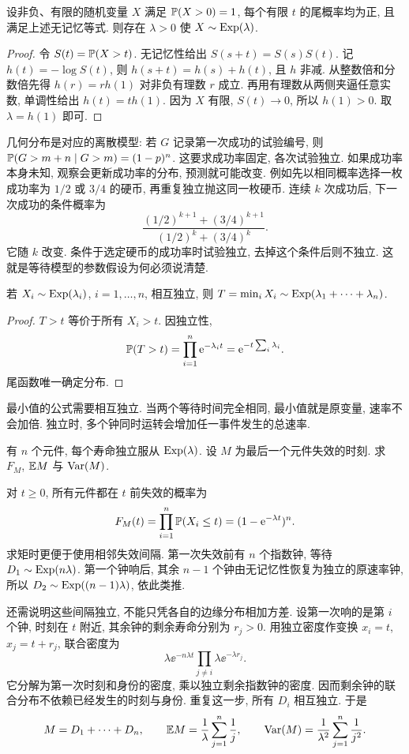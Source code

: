 \begin{proposition}[无记忆分布的刻画]
设非负、有限的随机变量 $X$ 满足 $\mathbb P(X>0)=1$, 每个有限 $t$ 的尾概率均为正, 且满足上述无记忆等式. 则存在 $\lambda>0$ 使 $X\sim\operatorname{Exp}(\lambda)$.
\end{proposition}
\begin{proof}
令 $S(t)=\mathbb P(X>t)$. 无记忆性给出 $S(s+t)=S(s)S(t)$. 记 $h(t)=-\log S(t)$, 则 $h(s+t)=h(s)+h(t)$, 且 $h$ 非减. 从整数倍和分数倍先得 $h(r)=rh(1)$ 对非负有理数 $r$ 成立. 再用有理数从两侧夹逼任意实数, 单调性给出 $h(t)=th(1)$. 因为 $X$ 有限, $S(t)\to0$, 所以 $h(1)>0$. 取 $\lambda=h(1)$ 即可.
\end{proof}

几何分布是对应的离散模型: 若 $G$ 记录第一次成功的试验编号, 则
$\mathbb P(G>m+n\mid G>m)=(1-p)^n$. 这要求成功率固定, 各次试验独立. 如果成功率本身未知, 观察会更新成功率的分布, 预测就可能改变. 例如先以相同概率选择一枚成功率为 $1/2$ 或 $3/4$ 的硬币, 再重复独立抛这同一枚硬币. 连续 $k$ 次成功后, 下一次成功的条件概率为
\[
 \frac{(1/2)^{k+1}+(3/4)^{k+1}}{(1/2)^k+(3/4)^k}.
\]
它随 $k$ 改变. 条件于选定硬币的成功率时试验独立, 去掉这个条件后则不独立. 这就是等待模型的参数假设为何必须说清楚.

\begin{proposition}[独立指数变量的最小值]
若 $X_i\sim\operatorname{Exp}(\lambda_i)$, $i=1,\ldots,n$, 相互独立, 则
$T=\min_i X_i\sim\operatorname{Exp}(\lambda_1+\cdots+\lambda_n)$.
\end{proposition}
\begin{proof}
$T>t$ 等价于所有 $X_i>t$. 因独立性,
\[
 \mathbb P(T>t)=\prod_{i=1}^n\mathrm e^{-\lambda_i t}
 =\mathrm e^{-t\sum_i\lambda_i}.
\]
尾函数唯一确定分布.
\end{proof}

最小值的公式需要相互独立. 当两个等待时间完全相同, 最小值就是原变量, 速率不会加倍. 独立时, 多个钟同时运转会增加任一事件发生的总速率.

\begin{example}
有 $n$ 个元件, 每个寿命独立服从 $\operatorname{Exp}(\lambda)$. 设 $M$ 为最后一个元件失效的时刻. 求 $F_M$, $\mathbb E M$ 与 $\operatorname{Var}(M)$.
\end{example}
\begin{solution}
对 $t\ge0$, 所有元件都在 $t$ 前失效的概率为
\[
 F_M(t)=\prod_{i=1}^n\mathbb P(X_i\le t)=(1-\mathrm e^{-\lambda t})^n.
\]
求矩时更便于使用相邻失效间隔. 第一次失效前有 $n$ 个指数钟, 等待 $D_1\sim\operatorname{Exp}(n\lambda)$. 第一个钟响后, 其余 $n-1$ 个钟由无记忆性恢复为独立的原速率钟, 所以 $D_2\sim\operatorname{Exp}((n-1)\lambda)$, 依此类推.

还需说明这些间隔独立, 不能只凭各自的边缘分布相加方差. 设第一次响的是第 $i$ 个钟, 时刻在 $t$ 附近, 其余钟的剩余寿命分别为 $r_j>0$. 用独立密度作变换 $x_i=t$, $x_j=t+r_j$, 联合密度为
\[
 \lambda\ee^{-n\lambda t}\prod_{j\ne i}\lambda\ee^{-\lambda r_j}.
\]
它分解为第一次时刻和身份的密度, 乘以独立剩余指数钟的密度. 因而剩余钟的联合分布不依赖已经发生的时刻与身份. 重复这一步, 所有 $D_i$ 相互独立. 于是
\[
 M=D_1+\cdots+D_n,\qquad
 \mathbb E M=\frac1\lambda\sum_{j=1}^n\frac1j,\qquad
 \operatorname{Var}(M)=\frac1{\lambda^2}\sum_{j=1}^n\frac1{j^2}.
\]
\end{solution}

